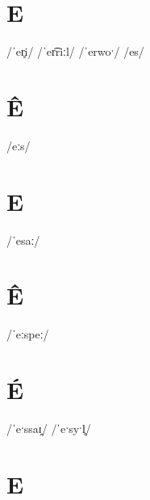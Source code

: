 \documentclass[10pt,a4paper,twoside]{book}
\begin{document}
\section*{E}

\begin{multicols}{3}
 {/ˈer̥i/} {}
 {/ˈer͡riːl/} {}
 {/ˈerwoˑ/} {}
 {/es/} {}
\end{multicols}

\section*{Ê}

\begin{multicols}{3}
 {/eːs/} {}
\end{multicols}

\section*{E}

\begin{multicols}{3}
 {/ˈesaː/} {}
\end{multicols}

\section*{Ê}

\begin{multicols}{3}
 {/ˈeːspeː/} {}
\end{multicols}

\section*{É}

\begin{multicols}{3}
 {/ˈeˑssaɪ̯/} {}
 {/ˈeˑsyˑl̥/} {}
\end{multicols}

\section*{E}
\end{document}
